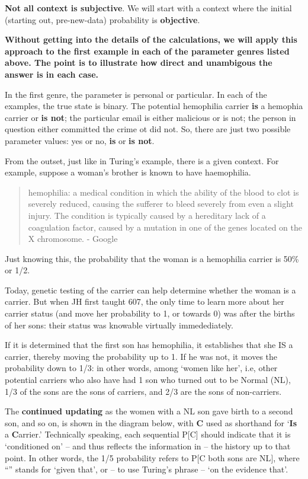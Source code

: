 \documentclass[]{book}
\begin{document}
\textbf{Not all context is subjective}. We will start with a context where the initial (starting out, pre-new-data) probability is \textbf{objective}.

\textbf{Without getting into the details of the calculations, we will apply this approach to the first example in each of the parameter genres listed above. The point is to illustrate how direct and unambigous the answer is in each case.}

In the first genre, the parameter is personal or particular. In each of the examples, the true state is binary. The potential hemophilia carrier \textbf{is} a hemophia carrier or \textbf{is not}; the particular email is either malicious or is not; the person in question either committed the crime ot did not. So, there are just two possible parameter values: yes or no, \textbf{is} or \textbf{is not}.

From the outset, just like in Turing's example, there is a given context. For example, suppose a woman's brother is known to have haemophilia.

\begin{quote}
hemophilia: a medical condition in which the ability of the blood to clot is severely reduced, causing the sufferer to bleed severely from even a slight injury. The condition is typically caused by a hereditary lack of a coagulation factor, caused by a mutation in one of the genes located on the X chromosome. - Google
\end{quote}

Just knowing this, the probability that the woman is a hemophilia carrier is 50\% or 1/2.

Today, genetic testing of the carrier can help determine whether the woman is a carrier. But when JH first taught 607, the only time to learn more about her carrier status (and move her probability to 1, or towards 0) was after the births of her sons: their status was knowable virtually immedediately.

If it is determined that the first son has hemophilia, it establishes that she IS a carrier, thereby moving the probability up to 1. If he was not, it moves the probability down to 1/3: in other words, among `women like her', i.e, other potential carriers who also have had 1 son who turned out to be Normal (NL), 1/3 of the sons are the sons of carriers, and 2/3 are the sons of non-carriers.

The \textbf{continued updating} as the women with a NL son gave birth to a second son, and so on, is shown in the diagram below, with \textbf{C} used as shorthand for `\textbf{Is} a \textbf{C}arrier.' Technically speaking, each sequential P{[}C{]} should indicate that it is `conditioned on' -- and thus reflects the information in -- the history up to that point. In other words, the 1/5 probability refers to P{[}C \textbar{} both sons are NL{]}, where ``\textbar{}'' stands for `given that', or -- to use Turing's phrase -- `on the evidence that'.
\end{document}
